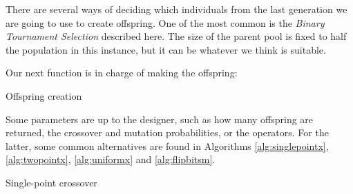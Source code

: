 	\vspace{0.3cm}

	There are several ways of deciding which individuals from the last generation we are going to use to create offspring. One of the most common is the \textit{Binary Tournament Selection} described here. The size of the parent pool is fixed to half the population in this instance, but it can be whatever we think is suitable.

	Our next function is in charge of making the offspring:

	\vspace{0.3cm}

	\begin{algorithm}[H]\label{alg:offspring_fs}


		\caption{Offspring creation}

	\end{algorithm}

	\vspace{0.3cm}

	Some parameters are up to the designer, such as how many offspring are returned, the crossover and mutation probabilities, or the operators. For the latter, some common alternatives are found in Algorithms \ref{alg:singlepointx}, \ref{alg:twopointx}, \ref{alg:uniformx} and \ref{alg:flipbitsm}.

	\vspace{0.3cm}

	\begin{algorithm}[H]\label{alg:singlepointx}


		\caption{Single-point crossover}

	\end{algorithm}

